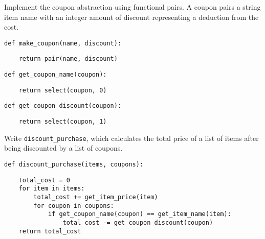 \question Implement the coupon abstraction using functional pairs.
A coupon pairs a string item name with an integer amount of discount
representing a deduction from the cost.

\begin{lstlisting}
def make_coupon(name, discount):
\end{lstlisting}
\begin{solution}[0.5in]
\begin{lstlisting}
    return pair(name, discount)
\end{lstlisting}
\end{solution}

\begin{lstlisting}
def get_coupon_name(coupon):
\end{lstlisting}
\begin{solution}[0.5in]
\begin{lstlisting}
    return select(coupon, 0)
\end{lstlisting}
\end{solution}

\begin{lstlisting}
def get_coupon_discount(coupon):
\end{lstlisting}
\begin{solution}[0.5in]
\begin{lstlisting}
    return select(coupon, 1)
\end{lstlisting}
\end{solution}

\question Write {\tt discount\_purchase}, which calculates the total price of a
list of items after being discounted by a list of coupons.

\begin{lstlisting}
def discount_purchase(items, coupons):
\end{lstlisting}
\begin{solution}[2in]
\begin{lstlisting}
    total_cost = 0
    for item in items:
        total_cost += get_item_price(item)
        for coupon in coupons:
            if get_coupon_name(coupon) == get_item_name(item):
                total_cost -= get_coupon_discount(coupon)
    return total_cost
\end{lstlisting}
\end{solution}
